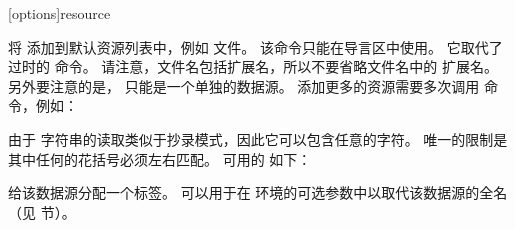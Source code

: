 \begin{ltxsyntax}

[options]{resource}


将  添加到默认资源列表中，例如  文件。
该命令只能在导言区中使用。
它取代了过时的  命令。
请注意，文件名包括扩展名，所以不要省略文件名中的  扩展名。
另外要注意的是， 只能是一个单独的数据源。
添加更多的资源需要多次调用  命令，例如：
\begin{ltxexample}




\end{ltxexample}
%
由于  字符串的读取类似于抄录模式，因此它可以包含任意的字符。
唯一的限制是其中任何的花括号必须左右匹配。
可用的  如下：

\begin{optionlist*}



给该数据源分配一个标签。
 可以用于在  环境的可选参数中以取代该数据源的全名
（见  节）。




\end{optionlist*}
\end{ltxsyntax}
